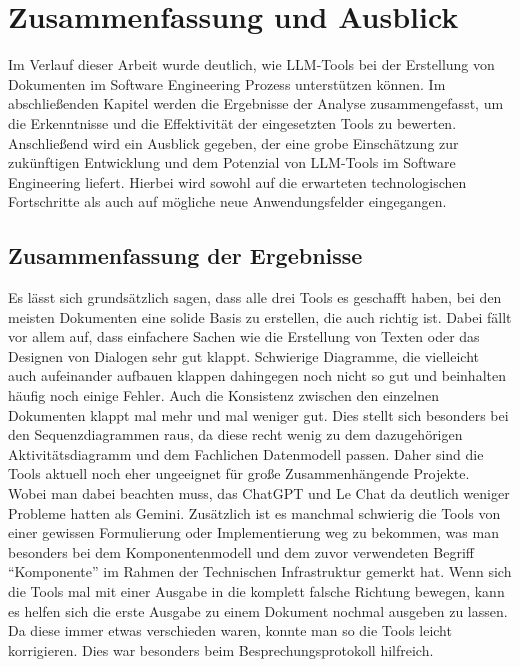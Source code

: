 
\chapter{Zusammenfassung und Ausblick} 

Im Verlauf dieser Arbeit wurde deutlich, wie LLM-Tools bei der Erstellung von Dokumenten im Software Engineering 
Prozess unterstützen können. Im abschließenden Kapitel werden die Ergebnisse der Analyse zusammengefasst, um die 
Erkenntnisse und die Effektivität der eingesetzten Tools zu bewerten. Anschließend wird ein Ausblick gegeben, der 
eine grobe Einschätzung zur zukünftigen Entwicklung und dem Potenzial von LLM-Tools im Software Engineering liefert. 
Hierbei wird sowohl auf die erwarteten technologischen Fortschritte als auch auf mögliche neue Anwendungsfelder 
eingegangen.

\section{Zusammenfassung der Ergebnisse}  \label{Zusammenfassung der Ergebnisse}

Es lässt sich grundsätzlich sagen, dass alle drei Tools es geschafft haben, bei den meisten Dokumenten eine solide 
Basis zu erstellen, die auch richtig ist. Dabei fällt vor allem auf, dass einfachere Sachen wie die Erstellung von 
Texten oder das Designen von Dialogen sehr gut klappt. Schwierige Diagramme, die vielleicht auch aufeinander 
aufbauen klappen dahingegen noch nicht so gut und beinhalten häufig noch einige Fehler. Auch die Konsistenz 
zwischen den einzelnen Dokumenten klappt mal mehr und mal weniger gut. Dies stellt sich besonders bei den 
Sequenzdiagrammen raus, da diese recht wenig zu dem dazugehörigen Aktivitätsdiagramm und dem Fachlichen 
Datenmodell passen. Daher sind die Tools aktuell noch eher ungeeignet für große Zusammenhängende Projekte. Wobei 
man dabei beachten muss, das ChatGPT und Le Chat da deutlich weniger Probleme hatten als Gemini. 
Zusätzlich ist es manchmal schwierig die Tools von einer gewissen Formulierung oder 
Implementierung weg zu bekommen, was man besonders bei dem Komponentenmodell und dem zuvor verwendeten Begriff 
``Komponente'' im Rahmen der Technischen Infrastruktur gemerkt hat. Wenn sich die Tools mal mit einer Ausgabe in 
die komplett falsche Richtung bewegen, kann es helfen sich die erste Ausgabe zu einem Dokument nochmal ausgeben zu 
lassen. Da diese immer etwas verschieden waren, konnte man so die Tools leicht korrigieren. Dies war besonders 
beim Besprechungsprotokoll hilfreich. 

